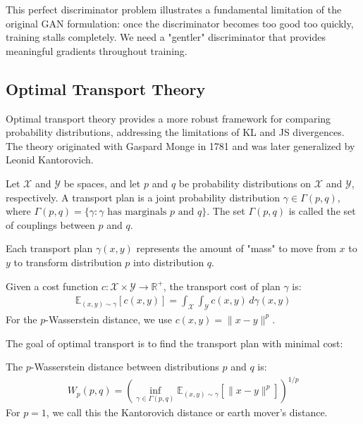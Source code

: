This perfect discriminator problem illustrates a fundamental limitation of the original GAN formulation: once the discriminator becomes too good too quickly, training stalls completely. We need a "gentler" discriminator that provides meaningful gradients throughout training.

\subsection{Optimal Transport Theory}

Optimal transport theory provides a more robust framework for comparing probability distributions, addressing the limitations of KL and JS divergences. The theory originated with Gaspard Monge in 1781 and was later generalized by Leonid Kantorovich.

\begin{definition}%
  \label{def:transport-plan}
  Let $\mathcal{X}$ and $\mathcal{Y}$ be spaces, and let $p$ and $q$ be probability distributions on $\mathcal{X}$ and $\mathcal{Y}$, respectively. A \textnormal{\sffamily transport plan} is a joint probability distribution $\gamma \in \Gamma(p, q)$, where $\Gamma(p, q) = \{\gamma : \gamma \text{ has marginals } p \text{ and } q\}$. The set $\Gamma(p, q)$ is called the \textnormal{\sffamily set of couplings} between $p$ and $q$.
\end{definition}

\begin{remark}
  Each transport plan $\gamma(x, y)$ represents the amount of "mass" to move from $x$ to $y$ to transform distribution $p$ into distribution $q$.
\end{remark}

\begin{definition}%
  \label{def:transport-cost}
  Given a cost function $c: \mathcal{X} \times \mathcal{Y} \to \mathbb{R}^+$, the \textnormal{\sffamily transport cost} of plan $\gamma$ is:
  \begin{align}
    \mathbb{E}_{(x,y) \sim \gamma}[c(x, y)] = \int_{\mathcal{X}} \int_{\mathcal{Y}} c(x, y) \, d\gamma(x, y)
  \end{align}
  For the $p$-Wasserstein distance, we use $c(x, y) = \|x - y\|^p$.
\end{definition}

The goal of optimal transport is to find the transport plan with minimal cost:

\begin{definition}%
  \label{def:wasserstein}
  The \textnormal{\sffamily $p$-Wasserstein distance} between distributions $p$ and $q$ is:
  \begin{align}
    W_p(p, q) = \left( \inf_{\gamma \in \Gamma(p, q)} \mathbb{E}_{(x,y) \sim \gamma}[\|x - y\|^p] \right)^{1/p}
  \end{align}
  For $p = 1$, we call this the \textnormal{\sffamily Kantorovich distance} or \textnormal{\sffamy earth mover's distance}.
\end{definition}

